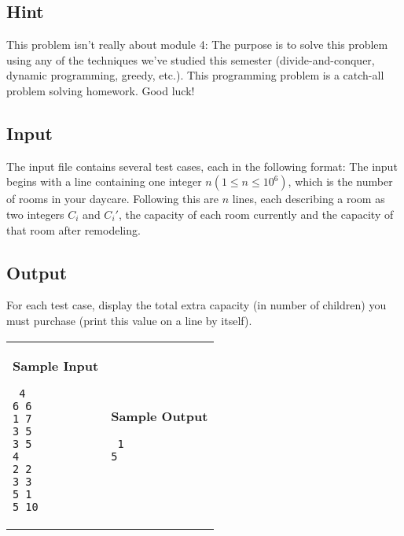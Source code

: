 \documentclass[11pt]{article}
\begin{document}
\subsection*{Hint}

This problem isn't really about module 4: The purpose is to solve this problem using any of the techniques we've studied this semester (divide-and-conquer, dynamic programming, greedy, etc.). This programming problem is a catch-all problem solving homework. Good luck!

\subsection*{Input}

The input file contains several test cases, each in the following format: The input begins with a line containing one integer $n (1 \leq n \leq 10^6)$, which is the number of rooms in your daycare. Following this are $n$ lines, each describing a room as two integers $C_i$ and $C_i'$, the capacity of each room currently and the capacity of that room after remodeling.

\subsection*{Output}

For each test case, display the total extra capacity (in number of children) you must purchase (print this value on a line by itself).


\vspace{0.25in}\hspace{-0.3in}\begin{tabular}{ll}

\parbox{3in}{{\large\bf Sample Input}

\vspace{0.15in}

{\tt 
4		\\
6 6		\\
1 7		\\
3 5		\\
3 5		\\
4		\\
2 2		\\
3 3		\\
5 1		\\
5 10
}
}

&

\parbox{3in}{{\large\bf Sample Output}

\vspace{0.15in}

{\tt
1		\\
5
}


}

\\
\end{tabular}
\end{document}
